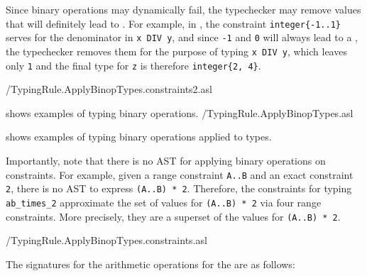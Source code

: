 

Since binary operations may dynamically fail, the typechecker may remove values
that will definitely lead to \dynamicerrorsterm.
For example, in ,
the constraint \verb|integer{-1..1}| serves for the denominator in \verb|x DIV y|,
and since \verb|-1| and \verb|0| will always lead to a \dynamicerrorterm,
the typechecker removes them for the purpose of typing \verb|x DIV y|,
which leaves only \verb|1| and the final type for \verb|z| is therefore
\verb|integer{2, 4}|.

{\typingtests/TypingRule.ApplyBinopTypes.constraints2.asl}

 shows examples of typing binary operations.
          {\typingtests/TypingRule.ApplyBinopTypes.asl}

 shows examples of typing binary operations
applied to \constrainedintegerterm{} types.

Importantly, note that there is no AST for applying binary operations on
constraints.
For example, given a range constraint \verb|A..B| and an exact constraint \verb|2|,
there is no AST to express \verb|(A..B) * 2|. Therefore, the constraints for typing
\verb|ab_times_2| approximate the set of values for \verb|(A..B) * 2| via four
range constraints. More precisely, they are a superset of the values for \verb|(A..B) * 2|.

\pagebreak
{}
          {\typingtests/TypingRule.ApplyBinopTypes.constraints.asl}


The signatures for the arithmetic operations for the \realtypeterm{} are as follows:



